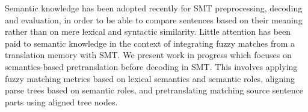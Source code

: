 Semantic knowledge has been adopted recently for SMT preprocessing, decoding and evaluation, in order to be able to compare sentences based on their meaning rather than on mere lexical and syntactic similarity. Little attention has been paid to semantic knowledge in the context of integrating fuzzy matches from a translation memory with SMT. We present work in progress which focuses on semantics-based pretranslation before decoding in SMT. This involves applying fuzzy matching metrics based on lexical semantics and semantic roles, aligning parse trees based on semantic roles, and pretranslating matching source sentence parts using aligned tree nodes.
